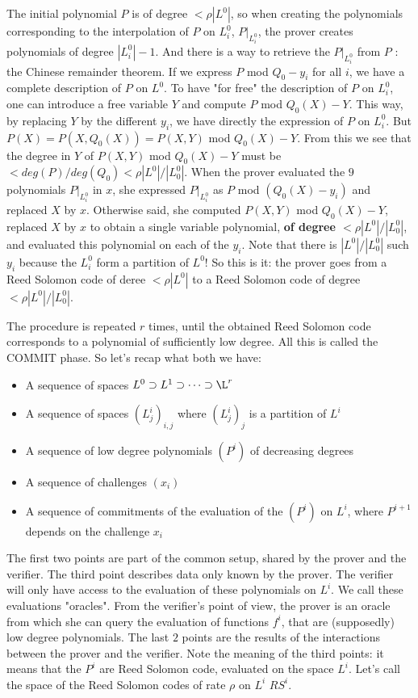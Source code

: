 \documentclass[12pt]{extarticle}
\newcommand{\<}{\langle}
\renewcommand{\>}{\rangle}
\theoremstyle{definition}
\begin{document}
The initial polynomial $P$ is of degree $<\rho|L^0|$, so when creating the polynomials corresponding to the interpolation of $P$ on $L^0_i$, $P|_{L^0_i}$, the prover creates polynomials of degree $|L^0_i|-1$. And there is a way to retrieve the $P|_{L^0_i}$ from $P$ : the Chinese remainder theorem. If we express $P$ mod $Q_0-y_i$ for all $i$, we have a complete description of $P$ on $L^0$. To have "for free" the description of $P$ on $L^0_i$, one can introduce a free variable $Y$ and compute $P$ mod $Q_0(X)-Y$. This way, by replacing  $Y$ by the different $y_i$, we have directly the expression of $P$ on $L^0_i$. But $P(X)=P(X,Q_0(X))=P(X,Y)$ mod $Q_0(X)-Y$. From this we see that the degree in $Y$ of $P(X,Y)$ mod $Q_0(X)-Y$ must be $<deg(P)/deg(Q_0)<\rho |L^0|/|L^0_0|$. When the prover evaluated the $9$ polynomials $P|_{L^0_i}$ in $x$, she expressed $P|_{L^0_i}$ as $P$ mod $(Q_0(X)-y_i)$ and replaced $X$ by $x$. Otherwise said, she computed $P(X,Y)$ mod $Q_0(X)-Y$, replaced $X$ by $x$ to obtain a single variable polynomial, \textbf{of degree $<\rho|L^0|/|L^0_0|$}, and evaluated this polynomial on each of the $y_i$. Note that there is $|L^0|/|L^0_0|$ such $y_i$ because the $L^0_i$ form a partition of $L^0$! So this is it: the prover goes from a Reed Solomon code of deree $<\rho|L^0|$ to a Reed Solomon code of degree $<\rho|L^0|/|L^0_0|$.

The procedure is repeated $r$ times, until the obtained Reed Solomon code corresponds to a polynomial of sufficiently low degree. All this is called the COMMIT phase. So let's recap what both we have:
\begin{itemize}
    \item A sequence of spaces $L^0\supset L^1\supset\dots\supset\L^r$
    \item A sequence of spaces $(L^i_j)_{i,j}$ where $(L^i_j)_j$ is a partition of $L^i$
    \item A sequence of low degree polynomials $(P^i)$ of decreasing degrees
    \item A sequence of challenges $(x_i)$
    \item A sequence of commitments of the evaluation of the $(P^i)$ on $L^i$, where $P^{i+1}$ depends on the challenge $x_i$
\end{itemize}
The first two points are part of the common setup, shared by the prover and the verifier. The third point describes data only known by the prover. The verifier will only have access to the evaluation of these polynomials on $L^i$. We call these evaluations "oracles". From the verifier's point of view, the prover is an oracle from which she can query the evaluation of functions $f^i$, that are (supposedly) low degree polynomials. The last $2$ points are the results of the interactions between the prover and the verifier. Note the meaning of the third points: it means that the $P^i$ are Reed Solomon code, evaluated on the space $L^i$. Let's call the space of the Reed Solomon codes of rate $\rho$ on $L^i$ $RS^i$.
\end{document}
